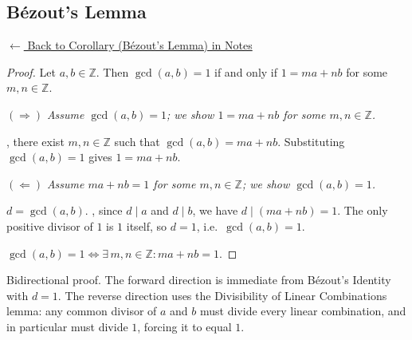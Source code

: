 
\subsection*{Bézout's Lemma}
\label{prf:bezout-lemma}

\begin{remark*}[Return]
\hyperref[cor:bezout-lemma]{$\leftarrow$ Back to Corollary (Bézout's Lemma) in Notes}
\end{remark*}

\begin{proof}
\Claim Let $a, b \in \mathbb{Z}$. Then $\gcd(a,b) = 1$ if and only if
$1 = ma + nb$ for some $m, n \in \mathbb{Z}$.

\medskip
\noindent$(\Rightarrow)$ \textit{Assume $\gcd(a,b) = 1$; we show $1 = ma + nb$
for some $m, n \in \mathbb{Z}$.}

, there exist $m, n \in \mathbb{Z}$ such that
$\gcd(a,b) = ma + nb$.
Substituting $\gcd(a,b) = 1$ gives $1 = ma + nb$. \checkbox

\medskip
\noindent$(\Leftarrow)$ \textit{Assume $ma + nb = 1$ for some $m, n \in \mathbb{Z}$;
we show $\gcd(a,b) = 1$.}

\Let $d = \gcd(a,b)$.
, since $d \mid a$ and $d \mid b$,
we have $d \mid (ma + nb) = 1$.
The only positive divisor of $1$ is $1$ itself, so $d = 1$,
i.e.\ $\gcd(a,b) = 1$. \checkbox

\Hence $\gcd(a,b) = 1 \iff \exists\, m,n \in \mathbb{Z}: ma + nb = 1$. \AsReq
\end{proof}

\begin{remark*}
Bidirectional proof. The forward direction is immediate from Bézout's Identity
with $d = 1$. The reverse direction uses the Divisibility of Linear
Combinations lemma: any common divisor of $a$ and $b$ must divide every linear
combination, and in particular must divide $1$, forcing it to equal $1$.

\end{remark*}


